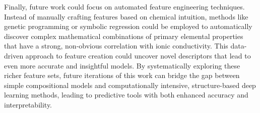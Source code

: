 Finally, future work could focus on automated feature engineering techniques. Instead of manually crafting features based on chemical intuition, methods like genetic programming or symbolic regression could be employed to automatically discover complex mathematical combinations of primary elemental properties that have a strong, non-obvious correlation with ionic conductivity. This data-driven approach to feature creation could uncover novel descriptors that lead to even more accurate and insightful models. By systematically exploring these richer feature sets, future iterations of this work can bridge the gap between simple compositional models and computationally intensive, structure-based deep learning methods, leading to predictive tools with both enhanced accuracy and interpretability.
